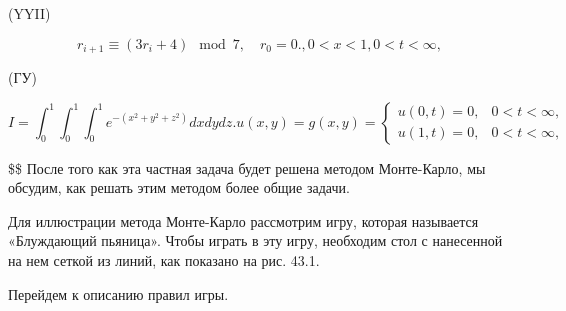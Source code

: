 \documentclass[
  ukrainian,
]{article}
\begin{document}
(YYII)

\[
r_{i+1} \equiv (3r_i + 4) \mod 7, \quad r_0 = 0.
,   0 < x < 1  ,   0 < t < \infty  ,
\]

(ГУ)

\[
I = \int_{0}^{1} \int_{0}^{1} \int_{0}^{1} e^{-(x^{2}+y^{2}+z^{2})} dx dy dz.
u(x,y) = g(x,y) =
\begin{cases} u(0, t) = 0, & 0 < t < \infty, \\ u(1, t) = 0, & 0 < t < \infty, \end{cases}
\]

\$\$ После того как эта частная задача будет решена методом Монте-Карло,
мы обсудим, как решать этим методом более общие задачи.

Для иллюстрации метода Монте-Карло рассмотрим игру, которая называется
«Блуждающий пьяница». Чтобы играть в эту игру, необходим стол с
нанесенной на нем сеткой из линий, как показано на рис. 43.1.

Перейдем к описанию правил игры.
\end{document}
